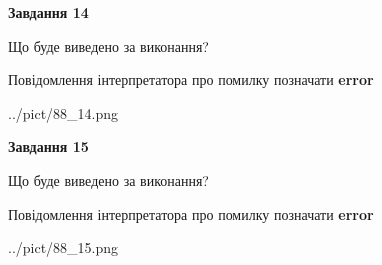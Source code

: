 \documentclass[11pt, ukrainian]{article}
\begin{document}
{\begin {large}
{\begin {center}\textbf{Завдання 14}\end {center}}\par
Що буде виведено за виконання? \par
Повідомлення інтерпретатора про помилку позначати \textbf{error}

\begin{center}
	{../pict/88_14.png}
\end{center}
\newpage

{\begin {center}\textbf{Завдання 15}\end {center}}\par
Що буде виведено за виконання? \par
Повідомлення інтерпретатора про помилку позначати \textbf{error}

\begin{center}
	{../pict/88_15.png}
\end{center}
\newpage

\end {large}}
\end{document}
